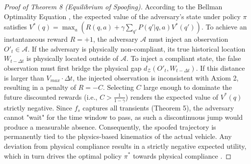 \documentclass[conference]{IEEEtran}
\newcommand{\Z}{\mathcal{Z}} %
\newcommand{\Auth}{\mathcal{A}} %
\begin{document}
\begin{proof}[Proof of Theorem 8 (Equilibrium of Spoofing)]
According to the Bellman Optimality Equation \cite{b10}, the expected value of the adversary’s state under policy $\pi$ satisfies $V^*(q) = \max_a (R(q, a) + \gamma \sum_{q'} P(q'|q,a)V^*(q'))$. To achieve an instantaneous reward $R = +1$, the adversary $\mathcal{A}$ must inject an observation $O'_{t} \in \Auth$. If the adversary is physically non-compliant, its true historical location $W_{t-\Delta t}$ is physically located outside of $\Auth$. To inject a compliant state, the false observation must first bridge the physical gap $d_\Z(O'_{t}, W_{t-\Delta t})$. If this distance is larger than $V_{max} \cdot \Delta t$, the injected observation is inconsistent with Axiom 2, resulting in a penalty of $R = -C$. Selecting $C$ large enough to dominate the future discounted rewards (i.e., $C > \frac{1}{1-\gamma}$) renders the expected value of $V^*(q)$ strictly negative. Since $f_s$ captures all transients (Theorem 5), the adversary cannot "wait" for the time window to pass, as such a discontinuous jump would produce a measurable absence. Consequently, the spoofed trajectory is permanently tied to the physics-based kinematics of the actual vehicle. Any deviation from physical compliance results in a strictly negative expected utility, which in turn drives the optimal policy $\pi^*$ towards physical compliance \cite{b11, b21}.
\end{proof}

\end{document}
